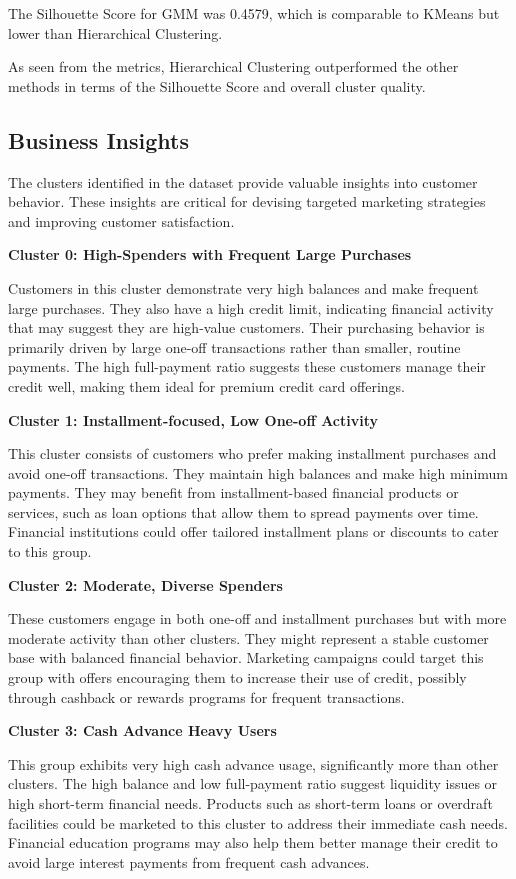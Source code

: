 \documentclass[runningheads,a4paper]{llncs}
\begin{document}
The Silhouette Score for GMM was 0.4579, which is comparable to KMeans but lower than Hierarchical Clustering.

As seen from the metrics, Hierarchical Clustering outperformed the other methods in terms of the Silhouette Score and overall cluster quality.

\subsection{Business Insights}

The clusters identified in the dataset provide valuable insights into customer behavior. These insights are critical for devising targeted marketing strategies and improving customer satisfaction.

\textbf{Cluster 0: High-Spenders with Frequent Large Purchases}

Customers in this cluster demonstrate very high balances and make frequent large purchases. They also have a high credit limit, indicating financial activity that may suggest they are high-value customers. Their purchasing behavior is primarily driven by large one-off transactions rather than smaller, routine payments. The high full-payment ratio suggests these customers manage their credit well, making them ideal for premium credit card offerings.

\textbf{Cluster 1: Installment-focused, Low One-off Activity}

This cluster consists of customers who prefer making installment purchases and avoid one-off transactions. They maintain high balances and make high minimum payments. They may benefit from installment-based financial products or services, such as loan options that allow them to spread payments over time. Financial institutions could offer tailored installment plans or discounts to cater to this group.

\textbf{Cluster 2: Moderate, Diverse Spenders}

These customers engage in both one-off and installment purchases but with more moderate activity than other clusters. They might represent a stable customer base with balanced financial behavior. Marketing campaigns could target this group with offers encouraging them to increase their use of credit, possibly through cashback or rewards programs for frequent transactions.

\textbf{Cluster 3: Cash Advance Heavy Users}

This group exhibits very high cash advance usage, significantly more than other clusters. The high balance and low full-payment ratio suggest liquidity issues or high short-term financial needs. Products such as short-term loans or overdraft facilities could be marketed to this cluster to address their immediate cash needs. Financial education programs may also help them better manage their credit to avoid large interest payments from frequent cash advances.
\end{document}

